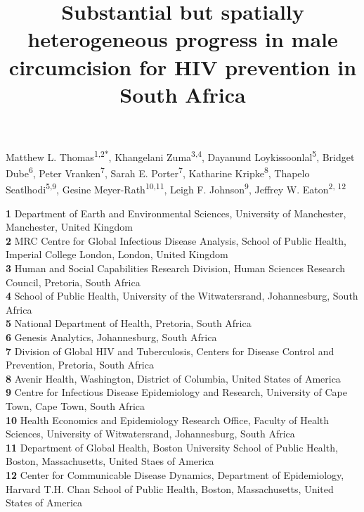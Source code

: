 \documentclass{article}
\title{Substantial but spatially heterogeneous progress in male circumcision for HIV prevention in South Africa}
\author{}
\date{}
\begin{document}

\maketitle

\vspace{-1cm}

Matthew L. Thomas\textsuperscript{1,2*},
Khangelani Zuma\textsuperscript{3,4},
Dayanund Loykissoonlal\textsuperscript{5},
Bridget Dube\textsuperscript{6},
Peter Vranken\textsuperscript{7},
Sarah E. Porter\textsuperscript{7},
Katharine Kripke\textsuperscript{8},
Thapelo Seatlhodi\textsuperscript{5,9},
Gesine Meyer-Rath\textsuperscript{10,11},
Leigh F. Johnson\textsuperscript{9},
Jeffrey W. Eaton\textsuperscript{2, 12} \\
\smallskip
  
\textbf{1} Department of Earth and Environmental Sciences, University of Manchester, Manchester, United Kingdom\\
\textbf{2} MRC Centre for Global Infectious Disease Analysis, School of Public Health, Imperial College London, London, United Kingdom\\
\textbf{3} Human and Social Capabilities Research Division, Human Sciences Research Council,  Pretoria, South Africa\\
\textbf{4} School of Public Health, University of the Witwatersrand, Johannesburg, South Africa\\
\textbf{5} National Department of Health, Pretoria, South Africa\\
\textbf{6} Genesis Analytics, Johannesburg, South Africa\\
\textbf{7} Division of Global HIV and Tuberculosis, Centers for Disease Control and Prevention, Pretoria, South Africa\\
\textbf{8} Avenir Health, Washington, District of Columbia, United States of America\\
\textbf{9} Centre for Infectious Disease Epidemiology and Research, University of Cape Town, Cape Town, South Africa \\
\textbf{10} Health Economics and Epidemiology Research Office, Faculty of Health Sciences, University of Witwatersrand, Johannesburg, South Africa\\
\textbf{11} Department of Global Health, Boston University School of Public Health, Boston, Massachusetts, United Staes of America\\
\textbf{12} Center for Communicable Disease Dynamics, Department of Epidemiology, Harvard T.H. Chan School of Public Health, Boston, Massachusetts, United States of America\\
\smallskip
\end{document}
